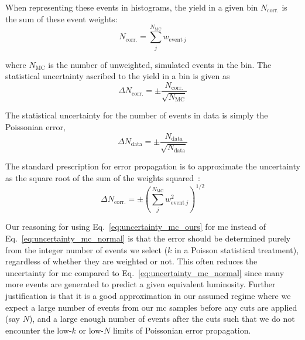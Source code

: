 When representing these events in histograms, the yield in a given bin $N_{\mathrm{corr.}}$ is the sum of these event weights:
\begin{equation}
    N_{\mathrm{corr.}} = \sum_j^{N_{\mathrm{MC}}} w_{\mathrm{event} \ j}
    \label{eq:bin_weight}
\end{equation}

where $N_{\mathrm{MC}}$ is the number of unweighted, simulated events in the bin. The statistical uncertainty ascribed to the yield in a bin is given as
\begin{equation}
    \Delta N_{\mathrm{corr.}} = \pm \frac{ N_{\mathrm{corr.}} }{ \sqrt{N_{\mathrm{MC}}} }
    \label{eq:uncertainty_mc_ours}
\end{equation}

The statistical uncertainty for the number of events in data is simply the Poissonian error,
\begin{equation}
    \Delta N_{\mathrm{data}} = \pm \frac{ N_{\mathrm{data}} }{ \sqrt{N_{\mathrm{data}}} }
    \label{eq:uncertainty_data}
\end{equation}

The standard prescription for error propagation is to approximate the uncertainty as the square root of the sum of the weights squared~\cite{bevington2003data}:
\begin{equation}
    \Delta N_{\mathrm{corr.}} = \pm \left( \sum_j^{N_{\mathrm{MC}}} w_{\mathrm{event} \ j}^2 \right) ^{1/2}
    \label{eq:uncertainty_mc_normal}
\end{equation}

Our reasoning for using Eq.~\ref{eq:uncertainty_mc_ours} for \acrshort{mc} instead of Eq.~\ref{eq:uncertainty_mc_normal} is that the error should be determined purely from the integer number of events we select ($k$ in a Poisson statistical treatment), regardless of whether they are weighted or not. This often reduces the uncertainty for \acrshort{mc} compared to Eq.~\ref{eq:uncertainty_mc_normal} since many more events are generated to predict a given equivalent luminosity. Further justification is that it is a good approximation in our assumed regime where we expect a large number of events from our \acrshort{mc} samples before any cuts are applied (say $N$), and a large enough number of events after the cuts such that we do not encounter the low-$k$ or low-$N$ limits of Poissonian error propagation.



